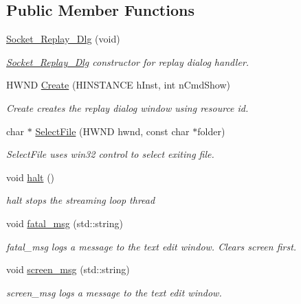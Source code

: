 \subsection*{Public Member Functions}
\begin{DoxyCompactItemize}
\item 
\hyperlink{class_socket___replay___dlg_a50bdd69b73fc5125b309d58515a30723}{Socket\+\_\+\+Replay\+\_\+\+Dlg} (void)
\begin{DoxyCompactList}\small\item\em \hyperlink{class_socket___replay___dlg}{Socket\+\_\+\+Replay\+\_\+\+Dlg} constructor for replay dialog handler. \end{DoxyCompactList}\item 
H\+W\+N\+D \hyperlink{class_socket___replay___dlg_a2332d912d2b026e3b612fae49c879436}{Create} (H\+I\+N\+S\+T\+A\+N\+C\+E h\+Inst, int n\+Cmd\+Show)
\begin{DoxyCompactList}\small\item\em Create creates the replay dialog window using resource id. \end{DoxyCompactList}\item 
char $\ast$ \hyperlink{class_socket___replay___dlg_a0b1190f805e22ef291252434037a8604}{Select\+File} (H\+W\+N\+D hwnd, const char $\ast$folder)
\begin{DoxyCompactList}\small\item\em Select\+File uses win32 control to select exiting file. \end{DoxyCompactList}\item 
\hypertarget{class_socket___replay___dlg_a010246f8405deaddacc4e1ea54f91ebd}{}void \hyperlink{class_socket___replay___dlg_a010246f8405deaddacc4e1ea54f91ebd}{halt} ()\label{class_socket___replay___dlg_a010246f8405deaddacc4e1ea54f91ebd}

\begin{DoxyCompactList}\small\item\em halt stops the streaming loop thread \end{DoxyCompactList}\item 
\hypertarget{class_socket___replay___dlg_a0820d0da37c941f6efed13c4516125c7}{}void \hyperlink{class_socket___replay___dlg_a0820d0da37c941f6efed13c4516125c7}{fatal\+\_\+msg} (std\+::string)\label{class_socket___replay___dlg_a0820d0da37c941f6efed13c4516125c7}

\begin{DoxyCompactList}\small\item\em fatal\+\_\+msg logs a message to the text edit window. Clears screen first. \end{DoxyCompactList}\item 
\hypertarget{class_socket___replay___dlg_a9d790347b3788cf3c1511e1a977df8ff}{}void \hyperlink{class_socket___replay___dlg_a9d790347b3788cf3c1511e1a977df8ff}{screen\+\_\+msg} (std\+::string)\label{class_socket___replay___dlg_a9d790347b3788cf3c1511e1a977df8ff}

\begin{DoxyCompactList}\small\item\em screen\+\_\+msg logs a message to the text edit window. \end{DoxyCompactList}\end{DoxyCompactItemize}
